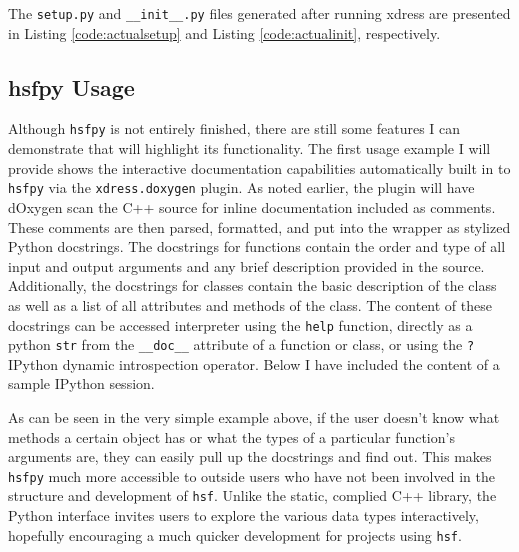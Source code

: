   The \texttt{setup.py} and \texttt{\_\_init\_\_.py} files generated after running xdress are presented in Listing \ref{code:actualsetup} and Listing \ref{code:actualinit}, respectively.

  \vspace{.2in}
  

  \vspace{.2in}
  
  \mainstretch{}

\subsection{hsfpy Usage} \label{sub:hsfpy_usage}

  Although \texttt{hsfpy} is not entirely finished,  there are still some features I can demonstrate that will highlight its functionality.  The first usage example I will provide shows the interactive documentation capabilities automatically built in to \texttt{hsfpy} via the \texttt{xdress.doxygen} plugin.  As noted earlier, the plugin will have dOxygen scan the C++ source for inline documentation included as comments. These comments are then parsed, formatted, and put into the wrapper as stylized Python docstrings.  The docstrings for functions contain the order and type of all input and output arguments and any brief description provided in the source. Additionally, the docstrings for classes contain the basic description of the class as well as a list of all attributes and methods of the class. The content of these docstrings can be accessed interpreter using the \texttt{help} function, directly as a python \texttt{str} from the \texttt{\_\_doc\_\_} attribute of a function or class, or using the \texttt{?} IPython dynamic introspection operator.  Below I have included the content of a sample IPython session.

  \vspace{.2in}
  
  \mainstretch{}

  As can be seen in the very simple example above, if the user doesn't know what methods a certain object has or what the types of a particular function's arguments are, they can easily pull up the docstrings and find out. This makes \texttt{hsfpy} much more accessible to outside users who have not been involved in the structure and development of \texttt{hsf}. Unlike  the static, complied C++ library, the Python interface invites users to explore the various data types interactively, hopefully encouraging a much quicker development for projects using \texttt{hsf}.

